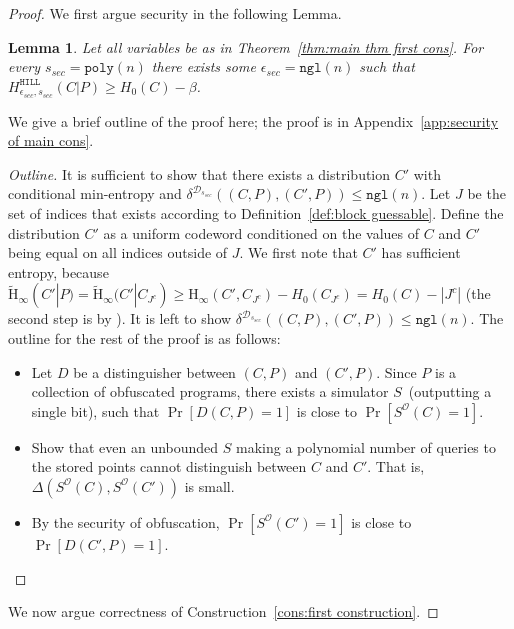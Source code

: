 \documentclass[11pt]{article}
\newcommand{\apref}[1]{\mbox{Appendix~\ref{#1}}}
\newcommand{\thref}[1]{\mbox{Theorem~\ref{#1}}}
\newcommand{\defref}[1]{\mbox{Definition~\ref{#1}}}
\newcommand{\consref}[1]{\mbox{Construction~\ref{#1}}}
\newcommand{\hill}{\ensuremath{\mathtt{HILL}}\xspace}
\newcommand{\poly}{\ensuremath{\mathtt{poly}}\xspace}
\newcommand{\ngl}{\ensuremath{\mathtt{ngl}}\xspace}
\newcommand{\Hoo}{\mathrm{H}_\infty}
\newcommand{\Hav}{\tilde{\mathrm{H}}_\infty}
\newtheorem{lemma}[theorem]{Lemma}
\begin{document}
\begin{proof}
We first argue security in the following Lemma.

\begin{lemma}
\label{lem:security of cons}
Let all variables be as in \thref{thm:main thm first cons}.  For every $s_{sec} = \poly(n)$ there exists some $\epsilon_{sec} = \ngl(n)$ such that $H^{\hill}_{\epsilon_{sec}, s_{sec}}( C | P ) \geq H_0(C) - \beta$.%
\end{lemma}

We give a brief outline of the proof here; the proof is in \apref{app:security of main cons}.
\begin{proof}[Outline]
It is sufficient to show that there exists a distribution $C'$ with conditional min-entropy and $\delta^{\mathcal{D}_{s_{sec}}}((C, P), (C', P))\le \ngl(n)$.  Let $J$ be the set of indices that exists according to \defref{def:block guessable}. Define the distribution $C'$ as a uniform codeword conditioned on the values of $C$ and $C'$ being equal on all indices outside of $J$.  We first note that $C'$ has sufficient entropy, because $\Hav(C' |P) = \Hav(C' | C_{J^c}) \ge \Hoo(C', C_{J^c}) - H_0(C_{J^c})  = H_0(C) - |J^c|$ (the second step is by \cite[Lemma 2.2b]{DBLP:journals/siamcomp/DodisORS08}).  It is left to show $\delta^{\mathcal{D}_{s_{sec}}}((C, P), (C', P)) \le \ngl(n)$.
The outline for the rest of the proof is as follows:
\begin{itemize}
\item Let $D$ be a distinguisher between $(C, P)$ and $(C', P)$. Since $P$ is a collection of obfuscated programs, there exists a simulator $S$~(outputting a single bit), such that $\Pr[D(C, P)=1]$ is close to $\Pr[S^{\mathcal{O}}(C)=1]$.
\item Show that even an unbounded $S$ making a polynomial number of queries to the stored points cannot distinguish between $C$ and $C'$.  That is, $\Delta(S^{\mathcal{O}}(C),S^{\mathcal{O}}(C'))$ is small.
\item By the security of obfuscation, $\Pr[S^{\mathcal{O}}(C')=1]$ is close to $\Pr[D(C', P)=1]$.
\end{itemize}
\end{proof}
We now argue correctness of \consref{cons:first construction}.

\end{proof}
\end{document}
